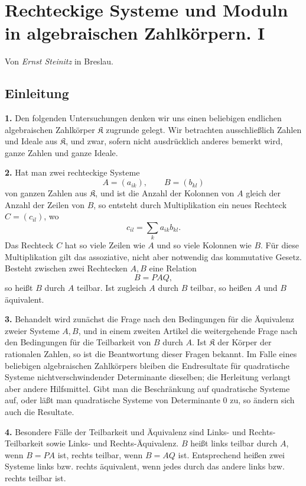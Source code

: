 \documentclass[11pt,a4paper]{article}
\newcommand{\K}{\mathfrak K}
\begin{document}
\section*{Rechteckige Systeme und Moduln in algebraischen Zahlkörpern. I}
\begin{center}
Von \emph{Ernst Steinitz} in Breslau.
\end{center}

\subsection*{Einleitung}

\textbf{1.} Den folgenden Untersuchungen denken wir uns einen beliebigen endlichen algebraischen Zahlkörper \(\K\) zugrunde gelegt. Wir betrachten ausschließlich Zahlen und Ideale aus \(\K\), und zwar, sofern nicht ausdrücklich anderes bemerkt wird, ganze Zahlen und ganze Ideale.

\textbf{2.} Hat man zwei rechteckige Systeme
\[
 A=(a_{ik}),\qquad B=(b_{kl})
\]
von ganzen Zahlen aus \(\K\), und ist die Anzahl der Kolonnen von \(A\) gleich der Anzahl der Zeilen von \(B\), so entsteht durch Multiplikation ein neues Rechteck \(C=(c_{il})\), wo
\[
 c_{il}=\sum_k a_{ik}b_{kl}.
\]
Das Rechteck \(C\) hat so viele Zeilen wie \(A\) und so viele Kolonnen wie \(B\). Für diese Multiplikation gilt das assoziative, nicht aber notwendig das kommutative Gesetz. Besteht zwischen zwei Rechtecken \(A,B\) eine Relation
\[
 B=PAQ,
\]
so heißt \(B\) durch \(A\) teilbar. Ist zugleich \(A\) durch \(B\) teilbar, so heißen \(A\) und \(B\) äquivalent.

\textbf{3.} Behandelt wird zunächst die Frage nach den Bedingungen für die Äquivalenz zweier Systeme \(A,B\), und in einem zweiten Artikel die weitergehende Frage nach den Bedingungen für die Teilbarkeit von \(B\) durch \(A\). Ist \(\K\) der Körper der rationalen Zahlen, so ist die Beantwortung dieser Fragen bekannt. Im Falle eines beliebigen algebraischen Zahlkörpers bleiben die Endresultate für quadratische Systeme nichtverschwindender Determinante dieselben; die Herleitung verlangt aber andere Hilfsmittel. Gibt man die Beschränkung auf quadratische Systeme auf, oder läßt man quadratische Systeme von Determinante \(0\) zu, so ändern sich auch die Resultate.

\textbf{4.} Besondere Fälle der Teilbarkeit und Äquivalenz sind Links- und Rechts-Teilbarkeit sowie Links- und Rechts-Äquivalenz. \(B\) heißt links teilbar durch \(A\), wenn \(B=PA\) ist, rechts teilbar, wenn \(B=AQ\) ist. Entsprechend heißen zwei Systeme links bzw. rechts äquivalent, wenn jedes durch das andere links bzw. rechts teilbar ist.
\end{document}
